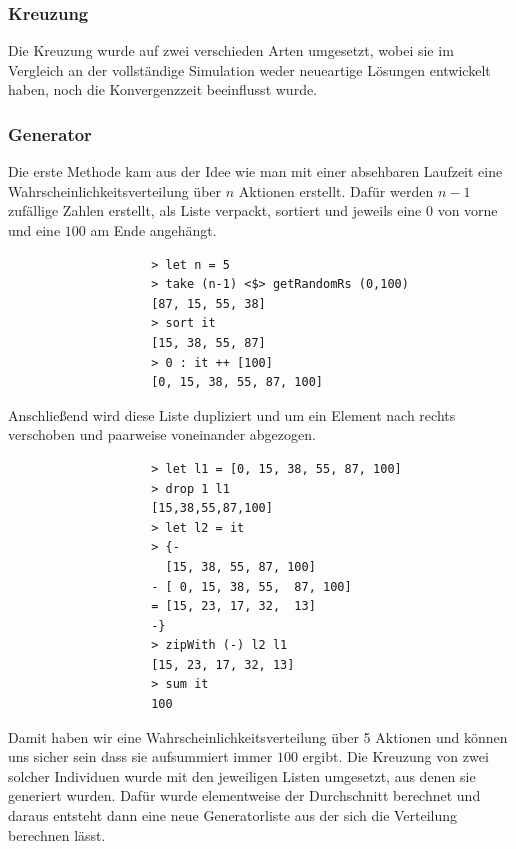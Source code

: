             \subsubsection*{Kreuzung}
            Die Kreuzung wurde auf zwei verschieden Arten umgesetzt, wobei sie im Vergleich an der vollständige Simulation weder neueartige Lösungen entwickelt haben, noch die Konvergenzzeit beeinflusst wurde.

            \subsubsection*{Generator}
            Die erste Methode kam aus der Idee wie man mit einer absehbaren Laufzeit eine Wahrscheinlichkeitsverteilung über $n$ Aktionen erstellt. Dafür werden $n-1$ zufällige Zahlen erstellt, als Liste verpackt, sortiert und jeweils eine $0$ von vorne und eine $100$ am Ende angehängt.

            \begin{verbatim}
                    > let n = 5
                    > take (n-1) <$> getRandomRs (0,100)
                    [87, 15, 55, 38]
                    > sort it
                    [15, 38, 55, 87]
                    > 0 : it ++ [100]
                    [0, 15, 38, 55, 87, 100]
            \end{verbatim}

            \noindent
            Anschließend wird diese Liste dupliziert und um ein Element nach rechts verschoben und paarweise voneinander abgezogen.
            \begin{verbatim}
                    > let l1 = [0, 15, 38, 55, 87, 100]
                    > drop 1 l1
                    [15,38,55,87,100]
                    > let l2 = it
                    > {-
                      [15, 38, 55, 87, 100]
                    - [ 0, 15, 38, 55,  87, 100]
                    = [15, 23, 17, 32,  13]
                    -}
                    > zipWith (-) l2 l1
                    [15, 23, 17, 32, 13]
                    > sum it
                    100
            \end{verbatim}

            \noindent
            Damit haben wir eine Wahrscheinlichkeitsverteilung über 5 Aktionen und können uns sicher sein dass sie aufsummiert immer $100$ ergibt. Die Kreuzung von zwei solcher Individuen wurde mit den jeweiligen Listen umgesetzt, aus denen sie generiert wurden. Dafür wurde elementweise der Durchschnitt berechnet und daraus entsteht dann eine neue Generatorliste aus der sich die Verteilung berechnen lässt.

